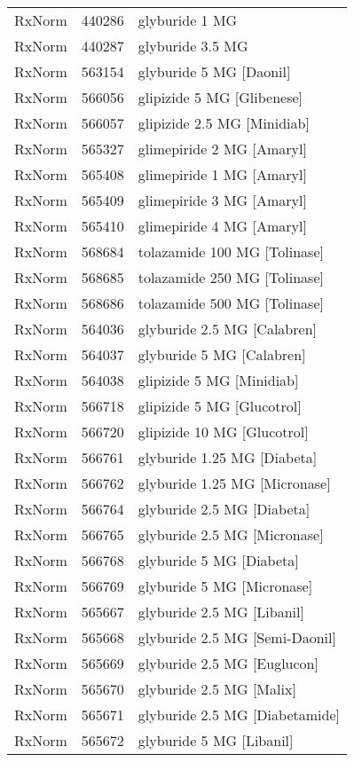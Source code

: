 \begin{longtable}{p{}p{}p{}}
  RxNorm & 440286 & glyburide 1 MG \\ 
  RxNorm & 440287 & glyburide 3.5 MG \\ 
  RxNorm & 563154 & glyburide 5 MG [Daonil] \\ 
  RxNorm & 566056 & glipizide 5 MG [Glibenese] \\ 
  RxNorm & 566057 & glipizide 2.5 MG [Minidiab] \\ 
  RxNorm & 565327 & glimepiride 2 MG [Amaryl] \\ 
  RxNorm & 565408 & glimepiride 1 MG [Amaryl] \\ 
  RxNorm & 565409 & glimepiride 3 MG [Amaryl] \\ 
  RxNorm & 565410 & glimepiride 4 MG [Amaryl] \\ 
  RxNorm & 568684 & tolazamide 100 MG [Tolinase] \\ 
  RxNorm & 568685 & tolazamide 250 MG [Tolinase] \\ 
  RxNorm & 568686 & tolazamide 500 MG [Tolinase] \\ 
  RxNorm & 564036 & glyburide 2.5 MG [Calabren] \\ 
  RxNorm & 564037 & glyburide 5 MG [Calabren] \\ 
  RxNorm & 564038 & glipizide 5 MG [Minidiab] \\ 
  RxNorm & 566718 & glipizide 5 MG [Glucotrol] \\ 
  RxNorm & 566720 & glipizide 10 MG [Glucotrol] \\ 
  RxNorm & 566761 & glyburide 1.25 MG [Diabeta] \\ 
  RxNorm & 566762 & glyburide 1.25 MG [Micronase] \\ 
  RxNorm & 566764 & glyburide 2.5 MG [Diabeta] \\ 
  RxNorm & 566765 & glyburide 2.5 MG [Micronase] \\ 
  RxNorm & 566768 & glyburide 5 MG [Diabeta] \\ 
  RxNorm & 566769 & glyburide 5 MG [Micronase] \\ 
  RxNorm & 565667 & glyburide 2.5 MG [Libanil] \\ 
  RxNorm & 565668 & glyburide 2.5 MG [Semi-Daonil] \\ 
  RxNorm & 565669 & glyburide 2.5 MG [Euglucon] \\ 
  RxNorm & 565670 & glyburide 2.5 MG [Malix] \\ 
  RxNorm & 565671 & glyburide 2.5 MG [Diabetamide] \\ 
  RxNorm & 565672 & glyburide 5 MG [Libanil] \\ 

\end{longtable}
